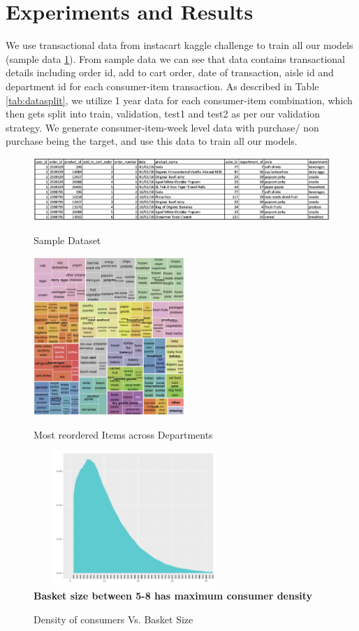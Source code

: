 \section{Experiments and Results}
\label{sec:eval}
We use transactional data from instacart kaggle challenge to train all our models (sample data \ref{fig:sampledata}). From 
sample data we can see that data contains transactional details including
order id, add to cart order, date of transaction, aisle id and department id for each consumer-item transaction.
As described in Table \ref{tab:datasplit}, we utilize 1 year data for each consumer-item combination, 
which then gets split into train, validation, test1 and test2 as per our validation strategy. 
We generate consumer-item-week level data with purchase/ non purchase being the target,
and use this data to train all our models.
 \begin{figure}[!t]
    \centering 
    \caption{Sample Dataset} 
    \includegraphics[width=6.6in]{img/sampledata.png} 
    \label{fig:sampledata} 
  \end{figure}

  \begin{figure}[t]
    \centering 
    \caption{Most reordered Items across Departments} 
    \includegraphics[width=2.25in]{img/items.png} 
    \label{fig:items} 
  \end{figure}

  \begin{figure}[t]
    \centering 
    \caption{Density of consumers Vs. Basket Size} 
    \includegraphics[width=3in, height = 2in]{img/basket.png} 
    \\ {\scriptsize \bf Basket size between 5-8 has maximum consumer density}
    \label{fig:basket} 
  \end{figure}

